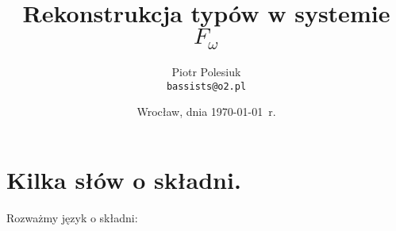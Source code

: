 \documentclass[11pt,leqno]{article}
\title{{\textbf{Rekonstrukcja typów w systemie $F_{\omega}$}}\\[1ex]}
\date{Wrocław, dnia \today\ r.}
\author{Piotr Polesiuk \\ \texttt{bassists@o2.pl}}
\begin{document}
\thispagestyle{empty}
\maketitle

\pagebreak

\theoremstyle{plain}
\newtheorem{twierdzenie}{Twierdzenie}
\newtheorem{lemat}{Lemat}
\newtheorem{fakt}{Fakt}

\theoremstyle{definition}
\newtheorem{definicja}{Definicja}

\section{Kilka słów o składni.}
\setcounter{equation}{0}

Rozważmy język o składni:
\end{document}

